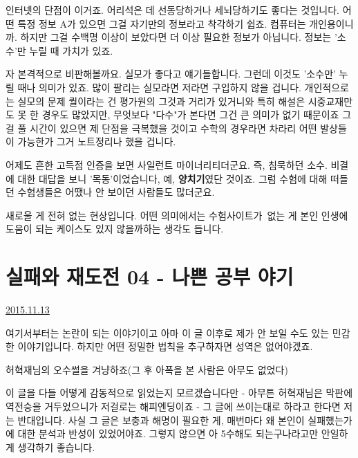 인터넷의 단점이 이거죠. 어리석은 데 선동당하거나 세뇌당하기도 좋다는 것입니다.
어떤 특정 정보 A가 있으면 그걸 자기만의 정보라고 착각하기 쉽죠. 컴퓨터는 개인용이니까.
하지만 그걸 수백명 이상이 보았다면 더 이상 필요한 정보가 아닙니다. 정보는 '소수'만 누릴 때 가치가 있죠.
\vspace{5mm}

자 본격적으로 비판해볼까요. 실모가 좋다고 얘기들합니다. 그런데 이것도 '소수만' 누릴 때나 의미가 있죠.
많이 팔리는 실모라면 저라면 구입하지 않을 겁니다. 개인적으로는 실모의 문제 퀄이라는 건 평가원의 그것과 거리가 있거니와
특히 해설은 시중교재만도 못 한 경우도 많았지만, 무엇보다 "다수"가 본다면 그건 큰 의미가 없기 때문이죠
그걸 풀 시간이 있으면 제 단점을 극복했을 것이고 수학의 경우라면 차라리 어떤 발상들이 가능한가 그거 노트정리나 했을 겁니다.
\vspace{5mm}

어제도 흔한 고득점 인증을 보면 사일런트 마이너리티더군요.
즉, 침묵하던 소수.
비결에 대한 대답을 보니 '목동'이었습니다, 예, \textbf{양치기}였단 것이죠.
그럼 수험에 대해 떠들던 수험생들은 어땠나
안 보이던 사람들도 많더군요.
\vspace{5mm}

새로울 게 전혀 없는 현상입니다.
어떤 의미에서는 수험사이트가 없는 게 본인 인생에 도움이 되는 케이스도 있지 않을까하는 생각도 듭니다.
\vspace{5mm}






\section{실패와 재도전 04 - 나쁜 공부 야기}
\href{https://www.kockoc.com/Apoc/482111}{2015.11.13}

\vspace{5mm}

여기서부터는 논란이 되는 이야기이고 아마 이 글 이후로 제가 안 보일 수도 있는 민감한 이야기입니다.
하지만 어떤 정밀한 법칙을 추구하자면 성역은 없어야겠죠.
\vspace{5mm}

허혁재님의 오수썰을 겨냥하죠(그 후 아폭을 본 사람은 아무도 없었다)
\vspace{5mm}

이 글을 다들 어떻게 감동적으로 읽었는지 모르겠습니다만 - 아무튼 허혁재님은 막판에 역전승을 거두었으니가 저걸로는 해피엔딩이죠 -
그 글에 쓰이는대로 하라고 한다면 저는 반대입니다.
사실 그 글은 보충과 해명이 필요한 게, 매번마다 왜 본인이 실패했는가에 대한 분석과 반성이 있었어야죠.
그렇지 않으면 아 5수해도 되는구나라고만 안일하게 생각하기 좋습니다.
\vspace{5mm}


